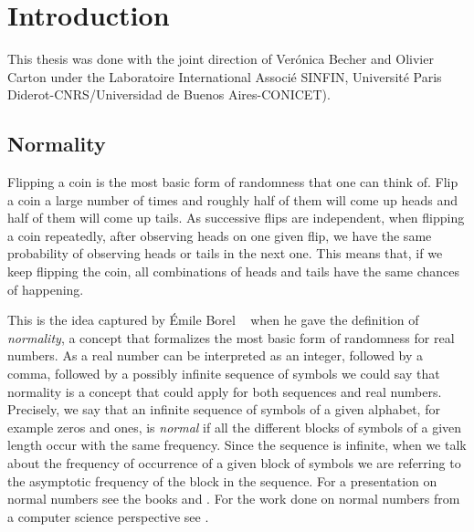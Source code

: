 \documentclass[11pt,a4paper]{tesis}
\begin{document}

\def\autor{Lucas Manuel Puterman Colomer}
\def\tituloTesis{Números Muy Normales}
\def\runtitulo{Números Muy Normales}
\def\runtitle{Very Normal Numbers}
\def\director{Dra. Verónica Becher}
\def\codirector{Olivier Carton}
\def\lugar{Buenos Aires,\today}
\def\libreta{830/13}
\def\email{lputerman@dc.com.ar}


\frontmatter
\pagestyle{empty}


\cleardoublepage


\cleardoublepage

\cleardoublepage
\tableofcontents

\mainmatter
\pagestyle{headings}



\chapter{Introduction}
This thesis was done with the joint direction of Verónica Becher and Olivier Carton under the Laboratoire International Associé SINFIN, Université Paris Diderot-CNRS/Universidad de Buenos Aires-CONICET).


\section{Normality}

Flipping a coin is the most basic form of randomness that one can think of. Flip a coin a large number of times and roughly half of them will come up heads and half of them will come up tails.
As successive flips are independent, when flipping a coin repeatedly, after observing heads on one given flip, we have the same probability of observing heads or tails in the next one. This means that, if we keep flipping the coin, all combinations of heads and tails have the same chances of happening.

This is the idea captured by Émile Borel  ~\cite{Borel} when he gave 
the definition of \textit{normality}, a concept that formalizes  
the most basic form of randomness for real numbers. 
As a real number can be interpreted as an integer, followed by a comma, followed by a possibly infinite sequence of symbols we could say that normality is a concept that could apply for both sequences and real numbers.
Precisely, we say that an infinite sequence of symbols of a given alphabet, for example zeros and ones, is \textit{normal} if all the different blocks of symbols of a given length occur with the same
  frequency.
Since the sequence is infinite, 
when we talk about the frequency of occurrence of a given block of symbols 
we are referring to the asymptotic frequency of the block in the sequence.
For a presentation on normal numbers see the books  \cite{kuipers} and \cite{bugeaud}. 
For the work done on normal numbers from a computer science perspective see \cite{BC2018}.
\end{document}
